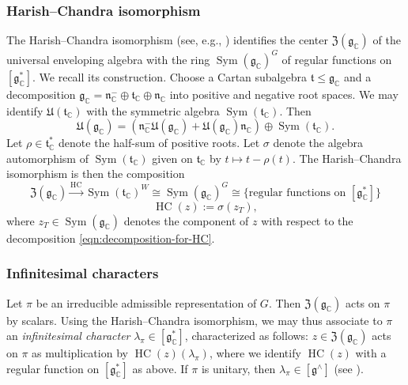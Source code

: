 \documentclass[reqno]{amsart}
\DeclareMathOperator{\Sym}{Sym}
\theoremstyle{plain} \newtheorem{theorem} {Theorem}
\theoremstyle{definition} \newtheorem{definition} [theorem] {Definition}
\theoremstyle{itplain} %
\numberwithin{equation}{section}
\numberwithin{theorem}{section}
\renewcommand{\leq}{\leqslant}
\DeclareMathOperator{\HACH}{HC}
\begin{document}
\subsubsection{Harish--Chandra isomorphism}
The Harish--Chandra isomorphism (see, e.g., \cite[\S9.4]{nelson-venkatesh-1}) identifies the center $\mathfrak{Z}(\mathfrak{g}_\mathbb{C})$ of the universal enveloping algebra with the ring $\Sym(\mathfrak{g}_{\mathbb{C}})^G$ of regular functions on $[\mathfrak{g}_\mathbb{C}^*]$.  We recall its construction.  Choose a Cartan subalgebra $\mathfrak{t} \leq \mathfrak{g}_\mathbb{C}$ and a decomposition $\mathfrak{g}_\mathbb{C} = \mathfrak{n}_{\mathbb{C}}^- \oplus \mathfrak{t}_\mathbb{C} \oplus \mathfrak{n}_{\mathbb{C}}$ into positive and negative root spaces.  We may identify $\mathfrak{U}(\mathfrak{t}_\mathbb{C})$ with the symmetric algebra $\Sym(\mathfrak{t}_\mathbb{C})$.  Then
\begin{equation}\label{eqn:decomposition-for-HC}
  \mathfrak{U}(\mathfrak{g}_\mathbb{C})
  = (\mathfrak{n}_{\mathbb{C}}^- \mathfrak{U}(\mathfrak{g}_{\mathbb{C}})
  + \mathfrak{U}(\mathfrak{g}_{\mathbb{C}})
  \mathfrak{n}_{\mathbb{C}})
  \oplus \Sym(\mathfrak{t}_\mathbb{C}).
\end{equation}
Let $\rho \in \mathfrak{t}_\mathbb{C}^*$ denote the half-sum of positive roots.  Let $\sigma$ denote the algebra automorphism of $\Sym(\mathfrak{t}_\mathbb{C})$ given on $\mathfrak{t}_\mathbb{C}$ by $t \mapsto t - \rho(t)$.  The Harish--Chandra isomorphism is then the composition
\[
  \mathfrak{Z}(\mathfrak{g}_\mathbb{C}) \xrightarrow{\HACH} \Sym(\mathfrak{t}_\mathbb{C})^W
  \cong 
  \Sym(\mathfrak{g}_{\mathbb{C}})^G \cong \{\text{regular functions on } [\mathfrak{g}_\mathbb{C}^*]\}
\]
\[
  \HACH(z) := \sigma(z_T),
\]
where $z_T \in \Sym(\mathfrak{g}_\mathbb{C})$ denotes the component of $z$ with respect to the decomposition \eqref{eqn:decomposition-for-HC}.

\subsubsection{Infinitesimal characters}\label{sec:infin-char}
Let $\pi$ be an irreducible admissible representation of $G$.  Then $\mathfrak{Z}(\mathfrak{g}_{\mathbb{C}})$ acts on $\pi$ by scalars.  Using the Harish--Chandra isomorphism, we may thus associate to $\pi$ an  \emph{infinitesimal character} $\lambda_\pi \in [\mathfrak{g}^*_{\mathbb{C}}]$, characterized as follows: $z \in \mathfrak{Z}(\mathfrak{g}_{\mathbb{C}})$ acts on $\pi$ as multiplication by $\HACH(z)(\lambda_\pi)$, where we identify $\HACH(z)$ with a regular function on $[\mathfrak{g}^*_{\mathbb{C}}]$ as above.  If $\pi$ is unitary, then $\lambda_\pi \in [\mathfrak{g}^\wedge]$ (see \cite[\S9.5]{nelson-venkatesh-1}).
\end{document}
